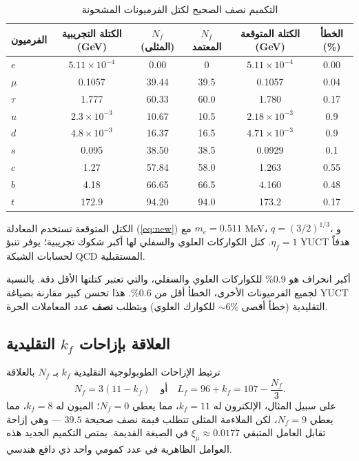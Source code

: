 \documentclass[12pt,a4paper]{article}
\begin{document}
	\begin{table}[H]
		\centering
		\caption{التكميم نصف الصحيح لكتل الفرميونات المشحونة}
		\label{tab:new_masses}
		\small
		\begin{tabular}{l c c c c c}
			\toprule
			الفرميون & الكتلة التجريبية (GeV) & \(N_f\) (المثلى) & \(N_f\) المعتمد & الكتلة المتوقعة (GeV) & الخطأ (\%) \\
			\midrule
			\(e\)   & \(5.11\times10^{-4}\) & 0.00  & 0      & \(5.11\times10^{-4}\) & 0.00 \\
			\(\mu\)  & 0.1057                & 39.44 & 39.5   & 0.1057               & 0.04 \\
			\(\tau\) & 1.777                 & 60.33 & 60.0   & 1.780                & 0.17 \\
			\(u\)   & \(2.3\times10^{-3}\)    & 10.67 & 10.5   & \(2.18\times10^{-3}\)  & 0.9 \\
			\(d\)   & \(4.8\times10^{-3}\)    & 16.37 & 16.5   & \(4.71\times10^{-3}\)  & 0.9 \\
			\(s\)   & 0.095                 & 38.50 & 38.5   & 0.0929               & 0.1 \\
			\(c\)   & 1.27                  & 57.84 & 58.0   & 1.263                & 0.55 \\
			\(b\)   & 4.18                  & 66.65 & 66.5   & 4.160                & 0.48 \\
			\(t\)   & 172.9                 & 94.20 & 94.0   & 173.2                & 0.17 \\
			\bottomrule
		\end{tabular}
		\par\smallskip
		\footnotesize الكتل المتوقعة تستخدم المعادلة (\ref{eq:new}) مع \(m_e = 0.511\) MeV، \(q = (3/2)^{1/3}\)، و \(\eta_f = 1\). كتل الكواركات العلوي والسفلي لها أكبر شكوك تجريبية؛ يوفر تنبؤ YUCT هدفاً لحسابات الشبكة QCD المستقبلية.
	\end{table}
	
	أكبر انحراف هو 0.9\% للكواركات العلوي والسفلي، والتي تعتبر كتلتها الأقل دقة. بالنسبة لجميع الفرميونات الأخرى، الخطأ أقل من 0.6\%. هذا تحسن كبير مقارنة بصياغة YUCT التقليدية (خطأ أقصى \(\sim 6\%\) للكوارك العلوي) ويتطلب \textbf{نصف} عدد المعاملات الحرة.
	
	\subsection{العلاقة بإزاحات \(k_f\) التقليدية}
	
	ترتبط الإزاحات الطوبولوجية التقليدية \(k_f\) بـ \(N_f\) بالعلاقة
	\begin{equation}
		N_f = 3(11 - k_f) \quad \text{أو} \quad L_f = 96 + k_f = 107 - \frac{N_f}{3}.
	\end{equation}
	على سبيل المثال، الإلكترون له \(k_f = 11\)، مما يعطي \(N_f = 0\)؛ الميون له \(k_f = 8\)، مما يعطي \(N_f = 9\)، لكن الملاءمة المثلى تتطلب قيمة نصف صحيحة \(39.5\) — وهي إزاحة تقابل العامل المتبقي \(\xi_\mu \approx 0.0177\) في الصيغة القديمة. يمتص التكميم الجديد هذه العوامل الظاهرية في عدد كمومي واحد ذي دافع هندسي.
	
\end{document}
